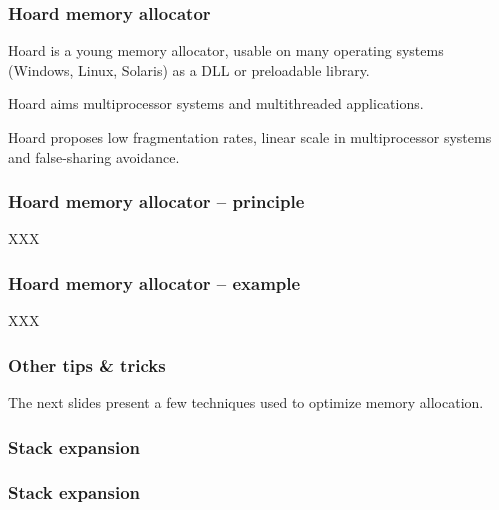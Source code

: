 
\begin{frame}
  \frametitle{Hoard memory allocator}

  Hoard is a young memory allocator, usable on many operating systems
  (Windows, Linux, Solaris) as a DLL or preloadable library.

  \-

  Hoard aims multiprocessor systems and multithreaded applications.

  \-

  Hoard proposes low fragmentation rates, linear scale in
  multiprocessor systems and false-sharing avoidance.

\end{frame}


\begin{frame}
  \frametitle{Hoard memory allocator -- principle}

  XXX
\end{frame}


\begin{frame}
  \frametitle{Hoard memory allocator -- example}

  XXX
\end{frame}


\begin{frame}
  \frametitle{Other tips \& tricks}

  The next slides present a few techniques used to optimize memory
  allocation.

\end{frame}


\begin{frame}
  \frametitle{Stack expansion}

  \begin{center}
  \end{center}

\end{frame}


\begin{frame}
  \frametitle{Stack expansion}

  \begin{center}
  \end{center}

\end{frame}

